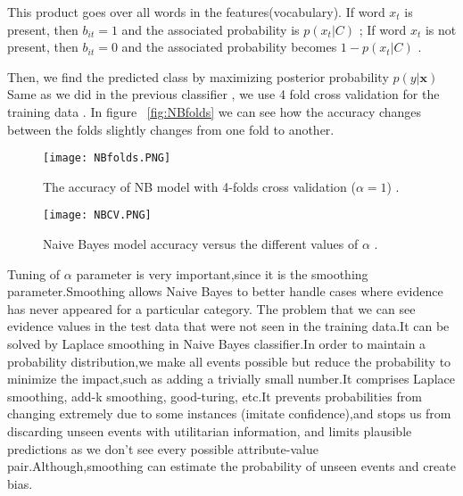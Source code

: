 \documentclass{article}
\begin{document}
 This product goes over all words in the features(vocabulary). If word  $x_t$  is present, then $b_{it}=1 $ and the associated probability is  $p(x_t \vert C)$  ; If word  $x_t$  is not present, then  $b_{it}=0 $ and the associated probability becomes  $1 - p(x_t \vert C)$ .

Then, we find the predicted class by maximizing posterior probability $p(y \vert \mathbf{x})$
Same as we did in the previous classifier , we use 4 fold cross validation for the training data . In figure ~\ref {fig:NBfolds}  we can see how the accuracy changes between the folds slightly changes from one fold to another.


\begin{figure}[H]
	\centering
	\begin{minipage}{0.45\textwidth}
		\centering
		\texttt{[image: NBfolds.PNG]}\caption{{\small The accuracy of NB model with 4-folds cross validation ($\alpha = 1$) .}}
		\label{fig:NBfolds}
	\end{minipage}\hfill
	\begin{minipage}{0.45\textwidth}
		\centering
		\texttt{[image: NBCV.PNG]}\caption{{\small Naive Bayes model accuracy versus the different values of $\alpha$ . }}
		\label{fig:NBCV}
	\end{minipage}
\end{figure}

Tuning of $\alpha$ parameter is very important,since it is the smoothing parameter.Smoothing allows Naive Bayes to better handle cases where evidence has never appeared for a particular category.
The problem that we can see evidence values in the test data that were not seen in the training data.It can be solved by Laplace smoothing in Naive Bayes classifier.In order to maintain a probability distribution,we make all events possible but reduce the probability to minimize the impact,such as adding a trivially small number.It comprises Laplace smoothing, add-k smoothing, good-turing, etc.It prevents probabilities from changing extremely due to some instances (imitate confidence),and stops us from discarding unseen events with utilitarian information, and limits plausible predictions as we don't see every possible attribute-value pair.Although,smoothing can estimate the probability of unseen events and create bias.
\end{document}
